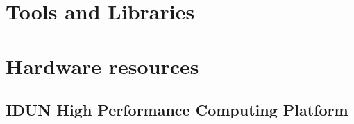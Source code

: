 \section{Tools and Libraries}
\label{sec:tools-and-libraries}

\section{Hardware resources}
\label{sec:hardware-resources}

\subsection{IDUN High Performance Computing Platform}
\label{sec:idun-high-performance-computing-platform}
